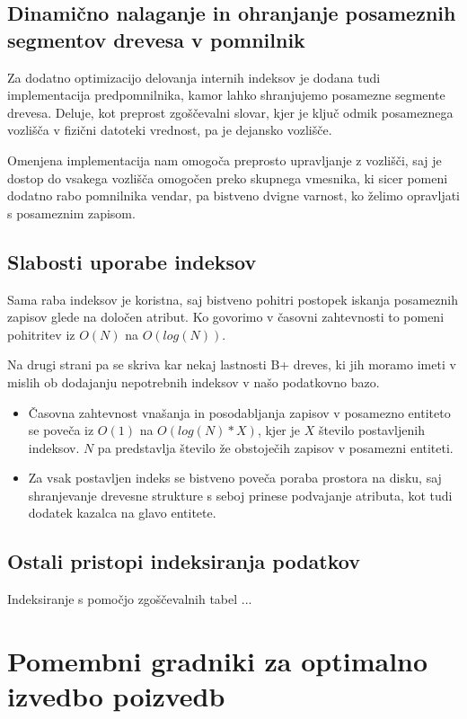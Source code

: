 \documentclass[a4paper,12pt,openright]{book}
\begin{document}
        \subsection{Dinamično nalaganje in ohranjanje posameznih segmentov drevesa v pomnilnik}
        Za dodatno optimizacijo delovanja internih indeksov je dodana tudi implementacija predpomnilnika, kamor lahko shranjujemo posamezne segmente drevesa. Deluje, kot preprost zgoščevalni slovar, kjer je ključ odmik posameznega vozlišča v fizični datoteki vrednost, pa je dejansko vozlišče.

        Omenjena implementacija nam omogoča preprosto upravljanje z vozlišči, saj je dostop do vsakega vozlišča omogočen preko skupnega vmesnika, ki sicer pomeni dodatno rabo pomnilnika vendar, pa bistveno dvigne varnost, ko želimo opravljati s posameznim zapisom.
        
        \subsection{Slabosti uporabe indeksov}

        Sama raba indeksov je koristna, saj bistveno pohitri postopek iskanja posameznih zapisov glede na določen atribut. Ko govorimo v časovni zahtevnosti to pomeni pohitritev iz $O(N)$ na $O(log(N))$.

        Na drugi strani pa se skriva kar nekaj lastnosti B+ dreves, ki jih moramo imeti v mislih ob dodajanju nepotrebnih indeksov v našo podatkovno bazo.
        \begin{itemize}
            \item Časovna zahtevnost vnašanja in posodabljanja zapisov v posamezno entiteto se poveča iz $O(1)$ na $O(log(N) * X)$, kjer je $X$ število postavljenih indeksov. $N$ pa predstavlja število že obstoječih zapisov v posamezni entiteti.
            \item Za vsak postavljen indeks se bistveno poveča poraba prostora na disku, saj shranjevanje drevesne strukture s seboj prinese podvajanje atributa, kot tudi dodatek kazalca na glavo entitete.
        \end{itemize}

        \subsection{Ostali pristopi indeksiranja podatkov}
        \colorbox{BurntOrange}{Indeksiranje s pomočjo zgoščevalnih tabel ...}
        
    \section{Pomembni gradniki za optimalno izvedbo poizvedb}
\end{document}
